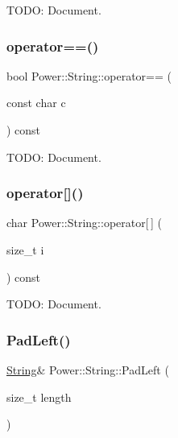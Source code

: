 T\+O\+DO\+: Document. 

\mbox{\label{class_power_1_1_string_a9a5cf72ccd272199f2eeb4baeaf7789f}} 
\subsubsection{\texorpdfstring{operator==()}{operator==()}\hspace{0.1cm}{\footnotesize\ttfamily [3/3]}}
{\footnotesize\ttfamily bool Power\+::\+String\+::operator== (\begin{DoxyParamCaption}\item[{const char}]{c }\end{DoxyParamCaption}) const\hspace{0.3cm}{\ttfamily [inline]}}



T\+O\+DO\+: Document. 

\mbox{\label{class_power_1_1_string_a9205107e5478a19d5f54cf0db0677be4}} 
\subsubsection{\texorpdfstring{operator[]()}{operator[]()}}
{\footnotesize\ttfamily char Power\+::\+String\+::operator\mbox{[}$\,$\mbox{]} (\begin{DoxyParamCaption}\item[{size\+\_\+t}]{i }\end{DoxyParamCaption}) const\hspace{0.3cm}{\ttfamily [inline]}}



T\+O\+DO\+: Document. 

\mbox{\label{class_power_1_1_string_a56ba1cfcfb79834e8267266a19b9a6f1}} 
\subsubsection{\texorpdfstring{Pad\+Left()}{PadLeft()}\hspace{0.1cm}{\footnotesize\ttfamily [1/2]}}
{\footnotesize\ttfamily \hyperlink{class_power_1_1_string}{String}\& Power\+::\+String\+::\+Pad\+Left (\begin{DoxyParamCaption}\item[{size\+\_\+t}]{length }\end{DoxyParamCaption})\hspace{0.3cm}{\ttfamily [inline]}}



